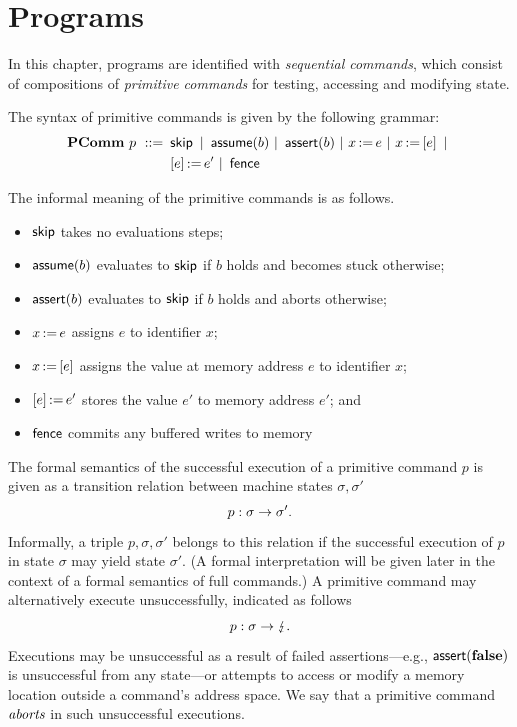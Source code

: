 \documentclass[11pt]{report}
\begin{document}
\section{Programs}
\label{sec:sequential-programs}

In this chapter, programs are identified with \emph{sequential commands}, which consist of compositions of \emph{primitive commands} for testing, accessing and modifying state. 

The syntax of primitive commands is given by the following grammar: \begin{align*} \mathbf{PComm}~p ~::=~ & \operatorname{\mathsf{skip}} ~|~ \operatorname{\mathsf{assume}}(b) ~|~ \operatorname{\mathsf{assert}}(b) ~|~ x \operatorname{:\!=} e ~|~ x \operatorname{:\!=} \left[ e \right] ~|~ \\ 
    & \left[ e \right] \operatorname{:\!=} e' ~|~ \operatorname{\mathsf{fence}}
\end{align*}

The informal meaning of the primitive commands is as follows. \begin{itemize}
    \item $\operatorname{\mathsf{skip}}$ takes no evaluations steps;
    \item $\operatorname{\mathsf{assume}}(b)$ evaluates to $\operatorname{\mathsf{skip}}$ if $b$ holds and becomes stuck otherwise; 
    \item $\operatorname{\mathsf{assert}}(b)$ evaluates to $\operatorname{\mathsf{skip}}$ if $b$ holds and aborts otherwise;
    \item $x \operatorname{:\!=} e$ assigns $e$ to identifier $x$; 
    \item $x \operatorname{:\!=} \left[ e \right]$ assigns the value at memory address $e$ to identifier $x$; 
    \item $\left[ e \right] \operatorname{:\!=} e'$ stores the value $e'$ to memory address $e'$; and
    \item $\operatorname{\mathsf{fence}}$ commits any buffered writes to memory 
\end{itemize}

The formal semantics of the successful execution of a primitive command $p$ is given as a transition relation between machine states $\sigma,\sigma'$ \[ p : \sigma \rightarrow \sigma'. \] Informally, a triple $p,\sigma,\sigma'$ belongs to this relation if the successful execution of $p$ in state $\sigma$ may yield state $\sigma'$. (A formal interpretation will be given later in the context of a formal semantics of full commands.) A primitive command may alternatively execute unsuccessfully, indicated as follows \[ p : \sigma \rightarrow \lightning. \] Executions may be unsuccessful as a result of failed assertions---e.g., $\operatorname{\mathsf{assert}}(\mathbf{false})$ is unsuccessful from any state---or attempts to access or modify a memory location outside a command's address space. We say that a primitive command $\emph{aborts}$ in such unsuccessful executions. 
\end{document}
